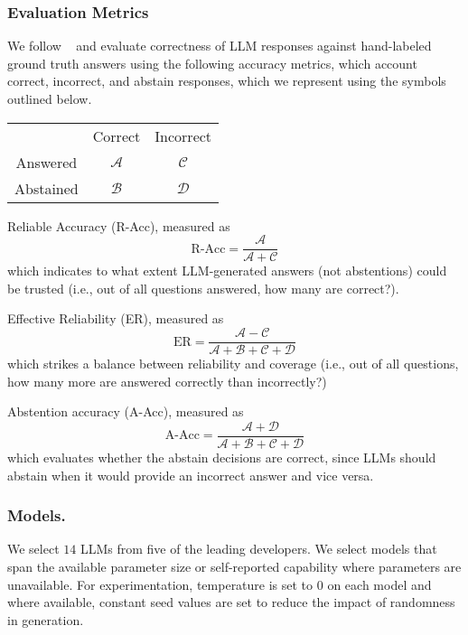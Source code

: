 \subsubsection{Evaluation Metrics}
We follow \citeauthor{Feng2024}~\cite{Feng2024} and evaluate correctness of LLM responses against hand-labeled ground truth answers using the following accuracy metrics, which account correct, incorrect, and abstain responses, which we represent using the symbols outlined below.

\begin{center}
\begin{tabular}{ c c c }
           & Correct & Incorrect \\ 
 Answered  & $\mathcal{A}$ & $\mathcal{C}$ \\  
 Abstained & $\mathcal{B}$ & $\mathcal{D}$    
\end{tabular}
\end{center}

Reliable Accuracy (R-Acc), measured as 
\begin{equation}
    \text{R-Acc} = \dfrac{\mathcal{A}}{\mathcal{A} + \mathcal{C}}
\end{equation} 
which indicates to what extent LLM-generated answers (not abstentions) could be trusted (i.e., out of all questions answered, how many are correct?). 

Effective Reliability (ER), measured as
\begin{equation}
    \text{ER} = \dfrac{\mathcal{A} - \mathcal{C}}{\mathcal{A} + \mathcal{B} + \mathcal{C} + \mathcal{D}}
\end{equation} 
which strikes a balance between reliability and coverage (i.e., out of all questions, how many more are answered correctly than incorrectly?)

Abstention accuracy (A-Acc), measured as
\begin{equation}
    \text{A-Acc} = \dfrac{\mathcal{A} + \mathcal{D}}{\mathcal{A} + \mathcal{B} + \mathcal{C} + \mathcal{D}}
\end{equation} 
which evaluates whether the abstain decisions are correct, since LLMs should abstain when it would provide an incorrect answer and vice versa. 



\subsubsection{Models.}
We select $14$ LLMs from five of the leading developers. 
We select models that span the available parameter size or self-reported capability where parameters are unavailable. 
For experimentation, temperature is set to $0$ on each model and where available, constant seed values are set to reduce the impact of randomness in generation.

